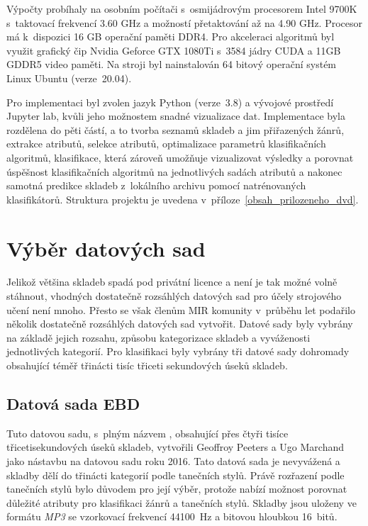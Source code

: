 Výpočty probíhaly na osobním počítači s~osmijádrovým procesorem Intel 9700K s~taktovací frekvencí 3.60 GHz a možností přetaktování až na 4.90 GHz. Procesor má k~dispozici 16 GB operační paměti DDR4. Pro akceleraci algoritmů byl využit grafický čip Nvidia Geforce GTX 1080Ti s~3584 jádry CUDA a 11GB GDDR5 video paměti. Na stroji byl nainstalován 64 bitový operační systém Linux Ubuntu (verze~20.04).

Pro implementaci byl zvolen jazyk Python (verze~3.8) a vývojové prostředí Jupyter lab, kvůli jeho možnostem snadné vizualizace dat. Implementace byla rozdělena do pěti částí, a to tvorba seznamů skladeb a jim přiřazených žánrů, extrakce atributů, selekce atributů, optimalizace parametrů klasifikačních algoritmů, klasifikace, která zároveň umožňuje vizualizovat výsledky a porovnat úspěšnost klasifikačních algoritmů na jednotlivých sadách atributů a nakonec samotná predikce skladeb z~lokálního archivu pomocí natrénovaných klasifikátorů. Struktura projektu je uvedena v~příloze~\ref{obsah_prilozeneho_dvd}.

\section{Výběr datových sad}
Jelikož většina skladeb spadá pod privátní licence a není je tak možné volně stáhnout, vhodných dostatečně rozsáhlých datových sad pro účely strojového učení není mnoho. Přesto se však členům MIR komunity v~průběhu let podařilo několik dostatečně rozsáhlých datových sad vytvořit. Datové sady byly vybrány na základě jejich rozsahu, způsobu kategorizace skladeb a vyváženosti jednotlivých kategorií. Pro klasifikaci byly vybrány tři datové sady dohromady obsahující téměř třinácti tisíc třiceti sekundových úseků skladeb.

\subsection*{Datová sada EBD}
Tuto datovou sadu, s~plným názvem , obsahující přes čtyři tisíce třicetisekundových úseků skladeb, vytvořili Geoffroy Peeters a Ugo Marchand jako nástavbu na datovou sadu  roku 2016. Tato datová sada je nevyvážená a skladby dělí do třinácti kategorií podle tanečních stylů. Právě rozřazení podle tanečních stylů bylo důvodem pro její výběr, protože nabízí možnost porovnat důležité atributy pro klasifikaci žánrů a tanečních stylů. Skladby jsou uloženy ve formátu \textit{MP3} se vzorkovací frekvencí 44100~Hz a bitovou hloubkou 16~bitů.\cite{ebd}


